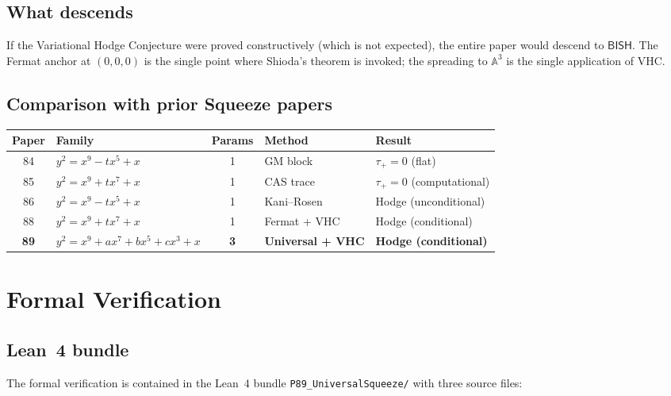 \documentclass[11pt,a4paper]{article}
\theoremstyle{definition}
\theoremstyle{remark}
\newcommand{\Aff}{\mathbb{A}}
\newcommand{\BISH}{\mathsf{BISH}}
\begin{document}
\subsection{What descends}

If the Variational Hodge Conjecture were proved constructively (which
is not expected), the entire paper would descend to $\BISH$.
The Fermat anchor at $(0,0,0)$ is the single point where Shioda's
theorem is invoked; the spreading to $\Aff^3$ is the single application
of VHC.

\subsection{Comparison with prior Squeeze papers}

\begin{center}
\begin{tabular}{@{}clcll@{}}
\toprule
\textbf{Paper} & \textbf{Family} & \textbf{Params} & \textbf{Method} & \textbf{Result} \\
\midrule
84 & $y^2 = x^9 - tx^5 + x$ & 1 & GM block & $\tau_+ = 0$ (flat) \\
85 & $y^2 = x^9 + tx^7 + x$ & 1 & CAS trace & $\tau_+ = 0$ (computational) \\
86 & $y^2 = x^9 - tx^5 + x$ & 1 & Kani--Rosen & Hodge (unconditional) \\
88 & $y^2 = x^9 + tx^7 + x$ & 1 & Fermat + VHC & Hodge (conditional) \\
\textbf{89} & $y^2 = x^9 + ax^7 + bx^5 + cx^3 + x$ & \textbf{3} & \textbf{Universal + VHC} & \textbf{Hodge (conditional)} \\
\bottomrule
\end{tabular}
\end{center}


\section{Formal Verification}

\subsection{Lean~4 bundle}

The formal verification is contained in the Lean~4 \cite{Lean4} bundle
\texttt{P89\_UniversalSqueeze/} with three source files:
\end{document}
